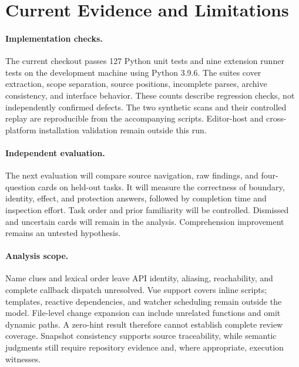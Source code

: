 \section{Current Evidence and Limitations}
\label{sec:evidence}
\paragraph{Implementation checks.}
The current checkout passes 127 Python unit tests and nine extension runner tests on the development machine using Python 3.9.6. The suites cover extraction, scope separation, source positions, incomplete parses, archive consistency, and interface behavior. These counts describe regression checks, not independently confirmed defects. The two synthetic scans and their controlled replay are reproducible from the accompanying scripts. Editor-host and cross-platform installation validation remain outside this run.

\paragraph{Independent evaluation.}
The next evaluation will compare source navigation, raw findings, and four-question cards on held-out tasks. It will measure the correctness of boundary, identity, effect, and protection answers, followed by completion time and inspection effort. Task order and prior familiarity will be controlled. Dismissed and uncertain cards will remain in the analysis. Comprehension improvement remains an untested hypothesis.

\paragraph{Analysis scope.}
Name clues and lexical order leave API identity, aliasing, reachability, and complete callback dispatch unresolved. Vue support covers inline scripts; templates, reactive dependencies, and watcher scheduling remain outside the model. File-level change expansion can include unrelated functions and omit dynamic paths. A zero-hint result therefore cannot establish complete review coverage. Snapshot consistency supports source traceability, while semantic judgments still require repository evidence and, where appropriate, execution witnesses.
